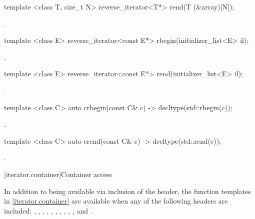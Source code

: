 %
\begin{itemdecl}
template <class T, size_t N> reverse_iterator<T*> rend(T (&array)[N]);
\end{itemdecl}
\begin{itemdescr}
\pnum \returns {}.
\end{itemdescr}

%
\begin{itemdecl}
template <class E> reverse_iterator<const E*> rbegin(initializer_list<E> il);
\end{itemdecl}
\begin{itemdescr}
\pnum \returns {}.
\end{itemdescr}

%
\begin{itemdecl}
template <class E> reverse_iterator<const E*> rend(initializer_list<E> il);
\end{itemdecl}
\begin{itemdescr}
\pnum \returns {}.
\end{itemdescr}

%
\begin{itemdecl}
template <class C> auto crbegin(const C& c) -> decltype(std::rbegin(c));
\end{itemdecl}
\begin{itemdescr}
\pnum \returns {}.
\end{itemdescr}

%
\begin{itemdecl}
template <class C> auto crend(const C& c) -> decltype(std::rend(c));
\end{itemdecl}
\begin{itemdescr}
\pnum \returns {}.
\end{itemdescr}

[iterator.container]{Container access}

\pnum
In addition to being available via inclusion of the  header,
the function templates in \ref{iterator.container} are available
when any of the following headers are included:
, , , ,
, , , ,
, , and .

